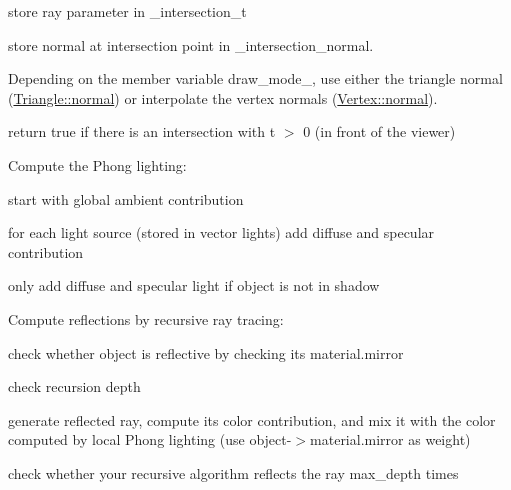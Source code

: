 \begin{DoxyRefList}
\begin{DoxyItemize}
\item store ray parameter in {\ttfamily \+\_\+intersection\+\_\+t}
\item store normal at intersection point in {\ttfamily \+\_\+intersection\+\_\+normal}.
\item Depending on the member variable {\ttfamily draw\+\_\+mode\+\_\+}, use either the triangle normal ({\ttfamily \hyperlink{structMesh_1_1Triangle_a697c3d7e2f4a316e7b486e048efff56d}{Triangle\+::normal}}) or interpolate the vertex normals ({\ttfamily \hyperlink{structMesh_1_1Vertex_adf43225146648954d9196e4b6fa47379}{Vertex\+::normal}}).
\item return {\ttfamily true} if there is an intersection with t $>$ 0 (in front of the viewer) 
\end{DoxyItemize}
\item[\label{todo__todo000005}%
\hypertarget{todo__todo000005}{}%
Member \hyperlink{classScene_a8c3c270f36a5e73805d925763450de7c}{Scene\+:\+:lighting} (const \hyperlink{classvec3}{vec3} \&\+\_\+point, const \hyperlink{classvec3}{vec3} \&\+\_\+normal, const \hyperlink{classvec3}{vec3} \&\+\_\+view, const \hyperlink{structMaterial}{Material} \&\+\_\+material)]Compute the Phong lighting\+:
\begin{DoxyItemize}
\item start with global ambient contribution
\item for each light source (stored in vector {\ttfamily lights}) add diffuse and specular contribution
\item only add diffuse and specular light if object is not in shadow 
\end{DoxyItemize}
\item[\label{todo__todo000004}%
\hypertarget{todo__todo000004}{}%
Member \hyperlink{classScene_aee2e562b23da56880ea30e33f9e76e1b}{Scene\+:\+:trace} (const \hyperlink{classRay}{Ray} \&\+\_\+ray, int \+\_\+depth)]Compute reflections by recursive ray tracing\+:
\begin{DoxyItemize}
\item check whether {\ttfamily object} is reflective by checking its {\ttfamily material.\+mirror}
\item check recursion depth
\item generate reflected ray, compute its color contribution, and mix it with the color computed by local Phong lighting (use {\ttfamily object-\/$>$material.\+mirror} as weight)
\item check whether your recursive algorithm reflects the ray {\ttfamily max\+\_\+depth} times 
\end{DoxyItemize}
\end{DoxyRefList}